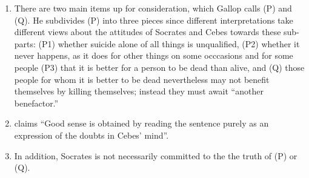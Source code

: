 \documentclass[12pt,letterpaper]{article}
\begin{document}
\begin{enumerate}
    \item There are two main items up for consideration, which Gallop calls (P) and (Q). He subdivides (P) into three pieces since different interpretations take different views about the attitudes of Socrates and Cebes towards these sub-parts: (P1) whether suicide alone of all things is unqualified, (P2) whether it never happens, as it does for other things on some occcasions and for some people (P3) that it is better for a person to be dead than alive, and (Q) those people for whom it is better to be dead nevertheless may not benefit themselves by killing themselves; instead they must await ``another benefactor.''
    \item \textcite[82]{gallop1975} claims ``Good sense is obtained by reading the sentence purely as an expression of the doubts in Cebes' mind''.
    \item In addition, Socrates is not necessarily committed to the the truth of (P) or (Q).
\end{enumerate}


\newpage
\printbibliography
\end{document}
